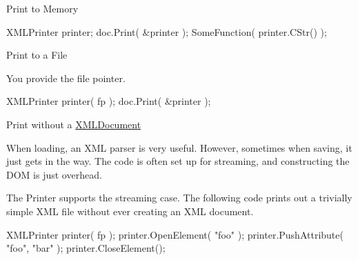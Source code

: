 Print to Memory

\begin{DoxyVerb}XMLPrinter printer;
doc.Print( &printer );
SomeFunction( printer.CStr() );
\end{DoxyVerb}


Print to a File

You provide the file pointer. \begin{DoxyVerb}XMLPrinter printer( fp );
doc.Print( &printer );
\end{DoxyVerb}


Print without a \hyperlink{classtinyxml2_1_1_x_m_l_document}{X\-M\-L\-Document}

When loading, an X\-M\-L parser is very useful. However, sometimes when saving, it just gets in the way. The code is often set up for streaming, and constructing the D\-O\-M is just overhead.

The Printer supports the streaming case. The following code prints out a trivially simple X\-M\-L file without ever creating an X\-M\-L document.

\begin{DoxyVerb}XMLPrinter printer( fp );
printer.OpenElement( "foo" );
printer.PushAttribute( "foo", "bar" );
printer.CloseElement();
\end{DoxyVerb}
 


